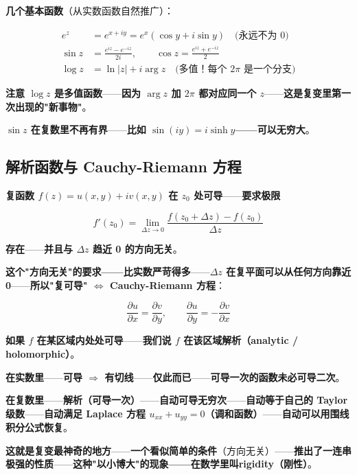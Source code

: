 \textbf{几个基本函数}（从实数函数自然推广）：

\begin{align*}
e^z &= e^{x+iy} = e^x(\cos y + i\sin y) \quad \text{(永远不为 0)} \\
\sin z &= \frac{e^{iz} - e^{-iz}}{2i}, \qquad \cos z = \frac{e^{iz} + e^{-iz}}{2} \\
\log z &= \ln|z| + i\arg z \quad \text{(多值！每个 $2\pi$ 是一个分支)}
\end{align*}

\textbf{注意 $\log z$ 是\textbf{多值函数}}——\textbf{因为 $\arg z$ 加 $2\pi$ 都对应同一个 $z$}——\textbf{这是复变里第一次出现的"新事物"}。

\textbf{$\sin z$ 在复数里\textbf{不再有界}}——\textbf{比如 $\sin(iy) = i\sinh y$——可以无穷大}。

\subsection{解析函数与 Cauchy-Riemann 方程}

\textbf{复函数 $f(z) = u(x,y) + iv(x,y)$ 在 $z_0$ 处\textbf{可导}}——\textbf{要求极限}

\[
f'(z_0) = \lim_{\Delta z \to 0} \frac{f(z_0 + \Delta z) - f(z_0)}{\Delta z}
\]

\textbf{存在}——\textbf{并且\textbf{与 $\Delta z$ 趋近 0 的方向无关}}。

\textbf{这个"方向无关"的要求——比实数严苛得多}——\textbf{$\Delta z$ 在复平面可以从\textbf{任何方向}靠近 0}——\textbf{所以"复可导" $\Longleftrightarrow$ Cauchy-Riemann 方程}：

\[
\boxed{\;\frac{\partial u}{\partial x} = \frac{\partial v}{\partial y}, \qquad \frac{\partial u}{\partial y} = -\frac{\partial v}{\partial x}\;}
\]

\textbf{如果 $f$ 在某区域内\textbf{处处可导}}——\textbf{我们说 $f$ 在该区域\textbf{解析}（analytic / holomorphic）}。

\begin{tcolorbox}[ahabox={Aha: 复可导 = 实可导 ×10}]
\textbf{在实数里}——\textbf{可导 $\Rightarrow$ 有切线}——\textbf{仅此而已}——\textbf{可导一次的函数未必可导二次}。

\medskip

\textbf{在复数里}——\textbf{解析（可导一次）}——\textbf{自动可导无穷次}——\textbf{自动等于自己的 Taylor 级数}——\textbf{自动满足 Laplace 方程 $u_{xx} + u_{yy} = 0$（调和函数）}——\textbf{自动可以用围线积分公式恢复}。

\medskip

\textbf{这就是复变最神奇的地方}——\textbf{一个看似简单的条件}（方向无关）——\textbf{推出了一连串极强的性质}——\textbf{这种"以小博大"的现象——在数学里叫\textbf{rigidity}（刚性）}。
\end{tcolorbox}

